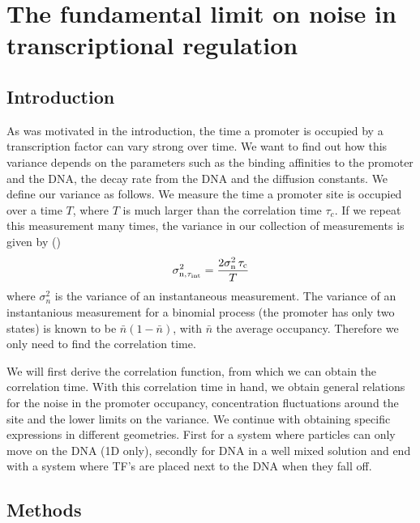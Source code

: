 \section{The fundamental limit on noise in transcriptional regulation}

\subsection{Introduction}
As was motivated in the introduction, the time a promoter is occupied by a transcription factor can vary strong over time. We want to find out how this variance depends on the parameters such as the binding affinities to the promoter and the DNA, the decay rate from the DNA and the diffusion constants. We define our variance as follows. We measure the time a promoter site is occupied over a time $T$, where $T$ is much larger than the correlation time $\tau_c$. If we repeat this measurement many times, the variance in our collection of measurements is given by ()
\begin{equation}
 \sigma_{\rm n, \tau_{\rm int}}^2 = \frac{2 \sigma_{\rm n}^2 \,\tau_{\rm c}}{T}
\end{equation}
where $\sigma_n^2$ is the variance of an instantaneous measurement. The variance of an instantanious measurement for a binomial process (the promoter has only two states) is known to be $\bar{n}(1-\bar{n})$, with $\bar{n}$ the average occupancy. Therefore we only need to find the correlation time. 

We will first derive the correlation function, from which we can obtain the correlation time. With this correlation time in hand, we obtain general relations for the noise in the promoter occupancy, concentration fluctuations around the site and the lower limits on the variance. We continue with obtaining specific expressions in different geometries. First for a system where particles can only move on the DNA (1D only), secondly for DNA in a well mixed solution and end with a system where TF's are placed next to the DNA when they fall off.


\subsection{Methods}

